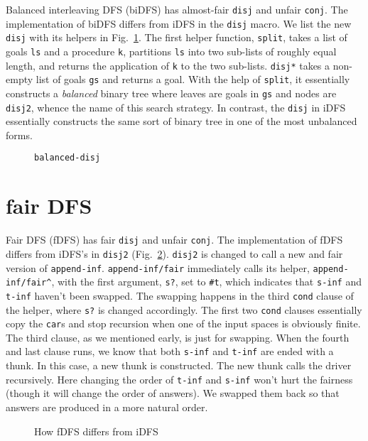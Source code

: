 \documentclass[format=acmlarge, review=true, authordraft=true]{acmart}
\newcommand{\conj}{\texttt{conj}}
\newcommand{\disj}{\texttt{disj}}
\begin{document}
Balanced interleaving DFS (biDFS) has almost-fair \disj{} and unfair \conj{}. The implementation of biDFS differs from iDFS in the \disj{} macro. We list the new \disj{} with its helpers in Fig.~\ref{balanced-disj}. The first helper function, \texttt{split}, takes a list of goals \texttt{ls} and a procedure \texttt{k}, partitions \texttt{ls} into two sub-lists of roughly equal length, and returns the application of \texttt{k} to the two sub-lists. \texttt{disj*} takes a non-empty list of goals \texttt{gs} and returns a goal. With the help of \texttt{split}, it essentially constructs a \emph{balanced} binary tree where leaves are goals in \texttt{gs} and nodes are \texttt{disj2}, whence the name of this search strategy. In contrast, the \disj{} in iDFS essentially constructs the same sort of binary tree in one of the most unbalanced forms.

\begin{figure}
  
  \caption{\texttt{balanced-disj}}
  \label{balanced-disj}
\end{figure}

\section{fair DFS}

Fair DFS (fDFS) has fair \disj{} and unfair \conj{}. The implementation of fDFS differs from iDFS's in \texttt{disj2} (Fig.~\ref{fDFS}). \texttt{disj2} is changed to call a new and fair version of \texttt{append-inf}. \texttt{append-inf/fair} immediately calls its helper, \texttt{append-inf/fair\^{}}, with the first argument, \texttt{s?}, set to \texttt{\#{}t}, which indicates that \texttt{s-inf} and \texttt{t-inf} haven't been swapped. The swapping happens in the third \texttt{cond} clause of the helper, where \texttt{s?} is changed accordingly. The first two \texttt{cond} clauses essentially copy the \texttt{car}s and stop recursion when one of the input spaces is obviously finite. The third clause, as we mentioned early, is just for swapping. When the fourth and last clause runs, we know that both \texttt{s-inf} and \texttt{t-inf} are ended with a thunk. In this case, a new thunk is constructed. The new thunk calls the driver recursively. Here changing the order of \texttt{t-inf} and \texttt{s-inf} won't hurt the fairness (though it will change the order of answers). We swapped them back so that answers are produced in a more natural order.

\begin{figure}
	
	\caption{How fDFS differs from iDFS}
	\label{fDFS}
\end{figure}
\end{document}
